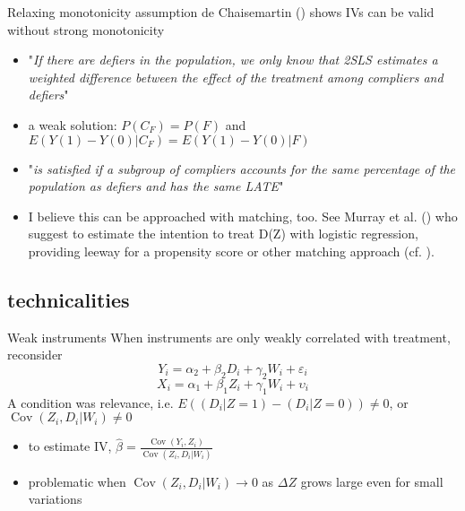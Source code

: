 \documentclass[aspectratio=169]{beamer}
\newcommand{\Cov}{\operatorname{Cov}}
\begin{document}
		\begin{frame}{Relaxing monotonicity assumption}
			de Chaisemartin (\citeyear{DeChaisemartin2017}) shows IVs can be valid without strong monotonicity \\ \vspace*{.15cm}
			\begin{itemize}
				\item "\textit{If there are defiers in the population, we only know that 2SLS estimates a weighted difference between the effect of the treatment among compliers and defiers}"
				\item<2->  a weak solution: $P(C_F)=P(F)$ and $E(Y(1) - Y(0) |  C_F) = E(Y(1) - Y(0) |  F) $
				\item<3-> "\textit{is satisfied if a subgroup of compliers accounts for the same percentage of the population as defiers and has the same LATE}"
				\item<4-> I believe this can be approached with matching, too. See Murray et al. (\citeyear{Murray2021}) who suggest to estimate the intention to treat D(Z) with logistic regression, providing leeway for a propensity score or other matching approach (cf. \cite{Hirano2003, Rosenbaum1984}).
			\end{itemize}
		\end{frame}

	\subsection{technicalities}
		\begin{frame}{Weak instruments}
			When instruments are only weakly correlated with treatment, reconsider
			\begin{equation}
				Y_{i} = \alpha_2 + \beta_2 {D}_{i} + \gamma_2 W_{i} + \varepsilon_{i}
			\end{equation}
			\begin{equation}
				X_{i} = \alpha_1 + \beta_1 Z_{i} + \gamma_1 W_{i} + \upsilon_{i}
			\end{equation}
			\vspace*{.15cm}
			A condition was relevance, i.e. $E((D_i|Z=1)-(D_i|Z=0)) \neq 0$, or $\Cov(Z_i,D_i|W_i) \neq 0$
			\begin{itemize}
			 \item to estimate IV, $\widehat{\beta}=\frac{\Cov(Y_i,Z_i)}{\Cov(Z_i,D_i|W_i)}$
			 \item problematic when $\Cov(Z_i,D_i|W_i) \to 0$ as $\Delta Z$ grows large even for small variations
			\end{itemize}
		\end{frame}
\end{document}
